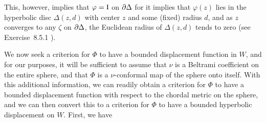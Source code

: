 This, however, implies that $\varphi = \mathrm{I}$ on $\partial {\Delta}$ for it
implies that $\varphi(z)$ lies in the hyperbolic disc $\Delta(z, d)$ with center
$z$ and some (fixed) radius $d$, and as $z$ converges to any $\zeta$ on
$\partial {\Delta}$, the Euclidean radius of $\Delta(z, d)$ tends to zero (see
Exercise~8.5.1 \cite{Beardon1991}).

We now seek a criterion for $\Phi$ to have a bounded displacement function in
$W$, and for our purposes, it will be sufficient to assume that $\nu$ is a
Beltrami coefficient on the entire sphere, and that $\Phi$ is a $\nu$-conformal
map of the sphere onto itself. With this additional information, we can readily
obtain a criterion for $\Phi$ to have a bounded displacement function with
respect to the chordal metric on the sphere, and we can then convert this to a
criterion for $\Phi$ to have a bounded hyperbolic displacement on $W$. First, we
have

